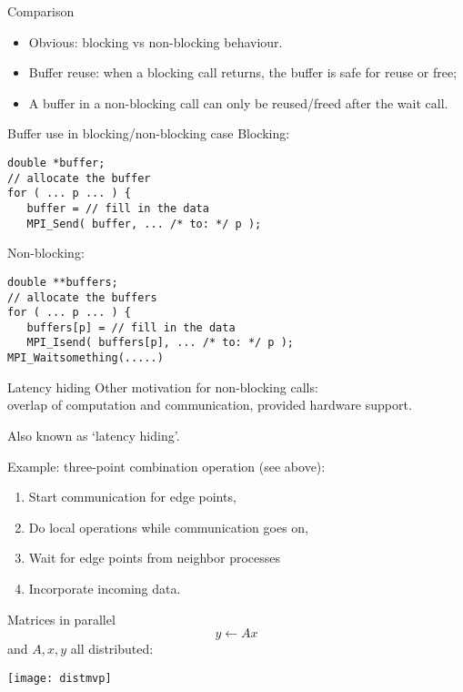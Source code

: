 \begin{numberedframe}{Comparison}
  \begin{itemize}
  \item Obvious: blocking vs non-blocking behaviour.
  \item Buffer reuse: when a blocking call returns, the buffer
    is safe for reuse or free;
  \item A buffer in a non-blocking call can only be reused/freed
    after the wait call.
  \end{itemize}
\end{numberedframe}

\begin{numberedframe}{Buffer use in blocking/non-blocking case}
Blocking:
\lstset{language=C}
\begin{lstlisting}
double *buffer;
// allocate the buffer
for ( ... p ... ) {
   buffer = // fill in the data
   MPI_Send( buffer, ... /* to: */ p );
\end{lstlisting}
Non-blocking:
\begin{lstlisting}
double **buffers;
// allocate the buffers
for ( ... p ... ) {
   buffers[p] = // fill in the data
   MPI_Isend( buffers[p], ... /* to: */ p );
MPI_Waitsomething(.....)
\end{lstlisting}
\end{numberedframe}

\begin{numberedframe}{Latency hiding}
  Other motivation for non-blocking calls:\\
  overlap of computation and communication, provided
  hardware support.

  Also known as `latency hiding'.

  Example: three-point combination operation (see above):
  \begin{enumerate}
  \item Start communication for edge points,
  \item Do local operations while communication goes on,
  \item Wait for edge points from neighbor processes
  \item Incorporate incoming data.
  \end{enumerate}
\end{numberedframe}

\begin{numberedframe}{Matrices in parallel}
  \[ y\leftarrow Ax\]
  and $A,x,y$ all distributed:

  \texttt{[image: distmvp]}
\end{numberedframe}

